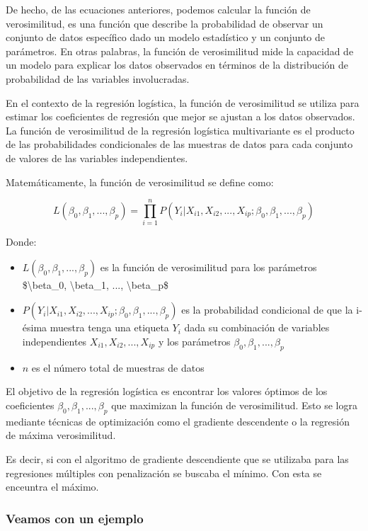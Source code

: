 \documentclass[
  letterpaper,
  DIV=11,
  numbers=noendperiod]{scrartcl}
\begin{document}
De hecho, de las ecuaciones anteriores, podemos calcular la función de
verosimilitud, es una función que describe la probabilidad de observar
un conjunto de datos específico dado un modelo estadístico y un conjunto
de parámetros. En otras palabras, la función de verosimilitud mide la
capacidad de un modelo para explicar los datos observados en términos de
la distribución de probabilidad de las variables involucradas.

En el contexto de la regresión logística, la función de verosimilitud se
utiliza para estimar los coeficientes de regresión que mejor se ajustan
a los datos observados. La función de verosimilitud de la regresión
logística multivariante es el producto de las probabilidades
condicionales de las muestras de datos para cada conjunto de valores de
las variables independientes.

Matemáticamente, la función de verosimilitud se define como:

\[
L(\beta_0, \beta_1, ..., \beta_p) = \prod_{i=1}^n P(Y_i|X_{i1}, X_{i2}, ..., X_{ip}; \beta_0, \beta_1, ..., \beta_p)
\]

Donde:

\begin{itemize}
\item
  \(L(\beta_0, \beta_1, ..., \beta_p)\) es la función de verosimilitud
  para los parámetros \$\textbackslash beta\_0, \textbackslash beta\_1,
  ..., \textbackslash beta\_p\$
\item
  \(P(Y_i|X_{i1}, X_{i2}, ..., X_{ip}; \beta_0, \beta_1, ..., \beta_p)\)
  es la probabilidad condicional de que la i-ésima muestra tenga una
  etiqueta \(Y_i\) dada su combinación de variables independientes
  \(X_{i1}, X_{i2}, ..., X_{ip}\) y los parámetros
  \(\beta_0, \beta_1, ..., \beta_p\)
\item
  \(n\) es el número total de muestras de datos
\end{itemize}

El objetivo de la regresión logística es encontrar los valores óptimos
de los coeficientes \(\beta_0, \beta_1, ..., \beta_p\) que maximizan la
función de verosimilitud. Esto se logra mediante técnicas de
optimización como el gradiente descendente o la regresión de máxima
verosimilitud.

Es decir, si con el algoritmo de gradiente descendiente que se utilizaba
para las regresiones múltiples con penalización se buscaba el mínimo.
Con esta se enceuntra el máximo.

\hypertarget{veamos-con-un-ejemplo}{%
\subsubsection{Veamos con un ejemplo}\label{veamos-con-un-ejemplo}}
\end{document}
